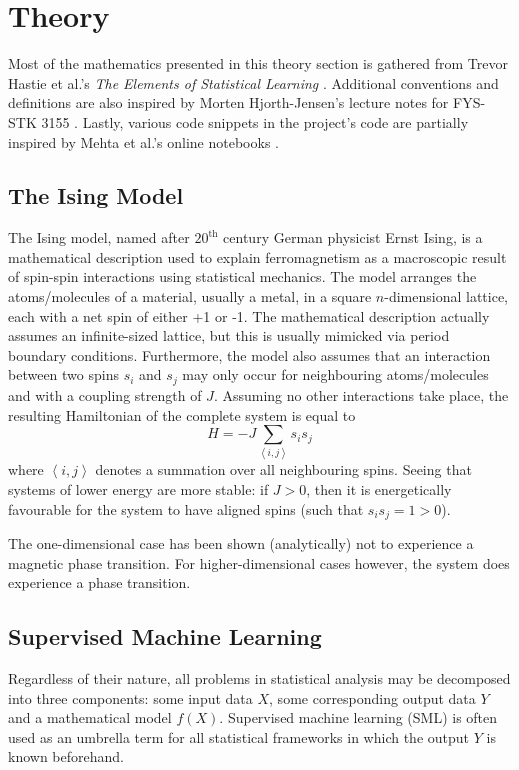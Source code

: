 \documentclass[nofootinbib,reprint,english]{revtex4-1}
\begin{document}
\section{Theory}
Most of the mathematics presented in this theory section is gathered from Trevor Hastie et al.'s \emph{The Elements of Statistical Learning} \cite{book}. Additional conventions and definitions are also inspired by Morten Hjorth-Jensen's lecture notes for FYS-STK 3155 \cite{notes}. Lastly, various code snippets in the project's code are partially inspired by Mehta et al.'s online notebooks \cite{notebooks}.
\subsection{The Ising Model}
The Ising model, named after \(20^\text{th}\) century German physicist Ernst Ising, is a mathematical description used to explain ferromagnetism as a macroscopic result of spin-spin interactions using statistical mechanics. The model arranges the atoms/molecules of a material, usually a metal, in a square \(n\)-dimensional lattice, each with a net spin of either +1 or -1. The mathematical description actually assumes an infinite-sized lattice, but this is usually mimicked via period boundary conditions. Furthermore, the model also assumes that an interaction between two spins \(s_i\) and \(s_j\) may only occur for neighbouring atoms/molecules and with a coupling strength of \(J\). Assuming no other interactions take place, the resulting Hamiltonian of the complete system is equal to
\begin{equation}
H=-J\sum_{\left\langle i,j\right\rangle}s_is_j
\end{equation}
where \(\left\langle i,j\right\rangle\) denotes a summation over all neighbouring spins. Seeing that systems of lower energy are more stable: if \(J>0\), then it is energetically favourable for the system to have aligned spins (such that \(s_is_j=1>0\)).

The one-dimensional case has been shown (analytically) not to experience a magnetic phase transition. For higher-dimensional cases however, the system does experience a phase transition.
\subsection{Supervised Machine Learning}
Regardless of their nature, all problems in statistical analysis may be decomposed into three components: some input data \(X\), some corresponding output data \(Y\) and a mathematical model \(f(X)\). Supervised machine learning (SML) is often used as an umbrella term for all statistical frameworks in which the output \(Y\) is known beforehand.
\end{document}
